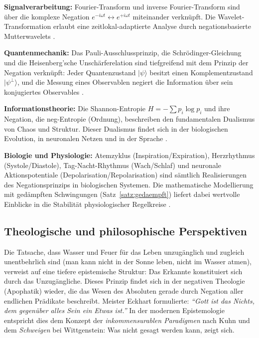 ﻿\documentclass[a4paper,12pt]{article}
\theoremstyle{definition}
\begin{document}
\textbf{Signalverarbeitung:} Fourier-Transform und inverse Fourier-Transform
sind \"uber die komplexe Negation $e^{-i\omega t} \leftrightarrow e^{+i\omega t}$
miteinander verkn\"upft. Die Wavelet-Transformation erlaubt eine
zeitlokal-adaptierte Analyse durch negationsbasierte Mutterwavelets \cite{Mallat1999}.

\textbf{Quantenmechanik:} Das Pauli-Ausschlussprinzip, die Schr\"odinger-Gleichung
und die Heisenberg'sche Unsch\"arferelation sind tiefgreifend mit dem Prinzip der
Negation verkn\"upft: Jeder Quantenzustand $|\psi\rangle$ besitzt einen
Komplementzustand $|\psi^\perp\rangle$, und die Messung eines Observablen negiert
die Information \"uber sein konjugiertes Observables \cite{Dirac1958}.

\textbf{Informationstheorie:} Die Shannon-Entropie $H = -\sum p_i \log p_i$ und
ihre Negation, die neg-Entropie (Ordnung), beschreiben den fundamentalen Dualismus
von Chaos und Struktur. Dieser Dualismus findet sich in der biologischen Evolution,
in neuronalen Netzen und in der Sprache \cite{Shannon1948}.

\textbf{Biologie und Physiologie:} Atemzyklus (Inspiration/Expiration), Herzrhythmus
(Systole/Diastole), Tag-Nacht-Rhythmus (Wach/Schlaf) und neuronale Aktionspotentiale
(Depolarisation/Repolarisation) sind s\"amtlich Realisierungen des Negationsprinzips
in biologischen Systemen. Die mathematische Modellierung mit ged\"ampften Schwingungen
(Satz~\ref{satz:gedaempft}) liefert dabei wertvolle Einblicke in die Stabilit\"at
physiologischer Regelkreise \cite{Murray2002}.

\subsection{Theologische und philosophische Perspektiven}

Die Tatsache, dass Wasser und Feuer f\"ur das Leben unzug\"anglich und zugleich
unentbehrlich sind (man kann nicht in der Sonne leben, nicht im Wasser atmen),
verweist auf eine tiefere epistemische Struktur: Das Erkannte konstituiert sich
durch das Unzug\"angliche. Dieses Prinzip findet sich in der negativen Theologie
(Apophatik) wieder, die das Wesen des Absoluten gerade durch Negation aller
endlichen Prädikate beschreibt. Meister Eckhart formulierte: \emph{``Gott ist das
Nichts, dem gegen\"uber alles Sein ein Etwas ist.''} In der modernen Epistemologie
entspricht dies dem Konzept der \emph{inkommensurablen Paradigmen} nach Kuhn und
dem \emph{Schweigen} bei Wittgenstein: Was nicht gesagt werden kann, zeigt sich.
\end{document}
